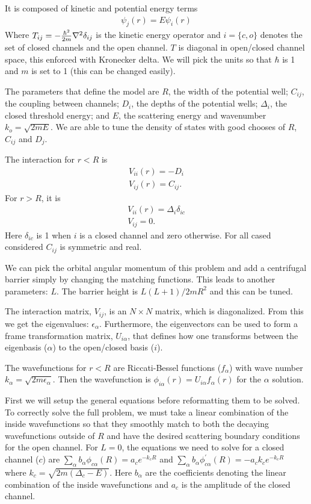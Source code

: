 \documentclass[twocolumn,showpacs,amsmath,amssymb]{revtex4}
\begin{document}
It is composed of kinetic and potential energy terms
\begin{eqnarray}
[T_{ij}+V_{ij}(r)]\psi_j(r)=E \psi_{i}(r)
\end{eqnarray}
Where $T_{ij}=-{\hbar^2 \over2m} {\nabla^2}\delta_{ij}$
is the kinetic energy operator and $i=\{c,o\}$ denotes the set of closed channels and the open channel.
$T$ is diagonal in open/closed channel space, this enforced with Kronecker delta. 
We will pick the units so that $\hbar$ is 1
and $m$ is set to 1 (this can be changed easily). 

The parameters that define the model are
$R$, the width of the potential well;
$C_{ij}$, the coupling between channels;
$D_i$, the depths of the potential wells;
$\Delta_i$, the closed threshold energy; and
$E$, the scattering energy and wavenumber $k_o=\sqrt{2mE}$.
We are able to tune the density of states with good chooses of
$R$, $C_{ij}$ and $D_j$.

The interaction for $r<R$ is
\begin{eqnarray}
V_{ii}(r)=-D_i
\\\nonumber
V_{ij}(r)=C_{ij}.
\end{eqnarray}
For $r>R$, it is
\begin{eqnarray}
V_{ii}(r)=\Delta_i\delta_{ic}
\\\nonumber
V_{ij}=0.
\end{eqnarray}
Here $\delta_{ic}$ is 1 when $i$
is a closed channel and zero otherwise. 
For all cased considered $C_{ij}$ is symmetric and real.

We can pick the orbital angular momentum of this problem and add a centrifugal 
barrier simply by changing the matching functions. This leads to another
parameters: $L$.  The barrier height is $L(L+1)/2mR^2$ and this can be tuned.

The interaction matrix, $V_{ij}$, is an $N\times N$ matrix, which is diagonalized. 
From this we get the eigenvalues: $\epsilon_\alpha$.  Furthermore, 
the eigenvectors can be used to form a frame transformation matrix, $U_{i\alpha}$, that defines how one transforms between the eigenbasis ($\alpha$) to the open/closed basis ($i$).

The wavefunctions for $r<R$ are Riccati-Bessel functions ($f_\alpha$) with
wave number $k_\alpha=\sqrt{2m\epsilon_\alpha}$.
Then the wavefunction  is $\phi_{i\alpha}(r)=U_{i\alpha}f_\alpha(r)$ for the $\alpha$ solution.

First we will setup the general equations before reformatting them to be solved.
To correctly solve the full problem, we must take a linear combination of
the inside wavefunctions so that they smoothly match to both the decaying 
wavefunctions outside of $R$ 
and have the desired scattering boundary conditions for the open channel.
For $L=0$, the equations we need to solve for a closed channel ($c$) are 
$\sum_\alpha b_\alpha \phi_{c\alpha}(R)=a_c e^{-k_c R}$ and
$\sum_\alpha b_\alpha \phi_{c\alpha}^\prime(R)=- a_c k_c e^{-k_c R}$
where $k_c=\sqrt{2m(\Delta_c-E)}$. 
Here $b_\alpha$ are the coefficients denoting the linear combination of
the inside wavefunctions
and $a_c$ is the amplitude of the closed channel.
\end{document}
